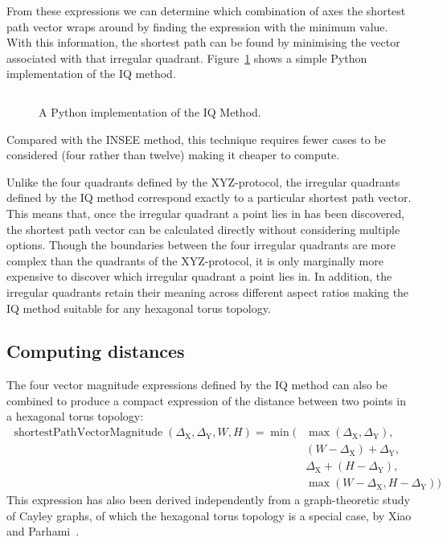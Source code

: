 			From these expressions we can determine which combination of axes the
			shortest path vector wraps around by finding the expression with the
			minimum value. With this information, the shortest path can be found by
			minimising the vector associated with that irregular quadrant.
			Figure~\ref{fig:iqmethod.py} shows a simple Python implementation of the
			IQ method.
			
			\begin{figure}
				\inputminted{python}{figures/iqmethod.py}
				
				\caption{A Python implementation of the IQ Method.}
				\label{fig:iqmethod.py}
			\end{figure}
			
			Compared with the INSEE method, this technique requires fewer cases to be
			considered (four rather than twelve) making it cheaper to compute.
			
			Unlike the four quadrants defined by the XYZ-protocol, the irregular
			quadrants defined by the IQ method correspond exactly to a particular
			shortest path vector. This means that, once the irregular quadrant a
			point lies in has been discovered, the shortest path vector can be
			calculated directly without considering multiple options. Though the
			boundaries between the four irregular quadrants are more complex than the
			quadrants of the XYZ-protocol, it is only marginally more expensive to
			discover which irregular quadrant a point lies in. In addition, the
			irregular quadrants retain their meaning across different aspect ratios
			making the IQ method suitable for any hexagonal torus topology.
		
		\subsection{Computing distances}
		
			The four vector magnitude expressions defined by the IQ method can also
			be combined to produce a compact expression of the distance between two
			points in a hexagonal torus topology:
			\begin{align*}
				\operatorname{shortestPathVectorMagnitude}(\Delta_\textrm{X}, \Delta_\textrm{Y}, W, H) =
				\operatorname{min}(&\operatorname{max}(\Delta_\textrm{X}, \Delta_\textrm{Y}),\\
				                   &(W - \Delta_\textrm{X}) + \Delta_\textrm{Y},\\
				                   &\Delta_\textrm{X} + (H - \Delta_\textrm{Y}),\\
				                   &\operatorname{max}(W-\Delta_\textrm{X}, H-\Delta_\textrm{Y}))
			\end{align*}
			This expression has also been derived independently from a
			graph-theoretic study of Cayley graphs, of which the hexagonal torus
			topology is a special case, by Xiao and Parhami~\cite{xiao04}.
		
